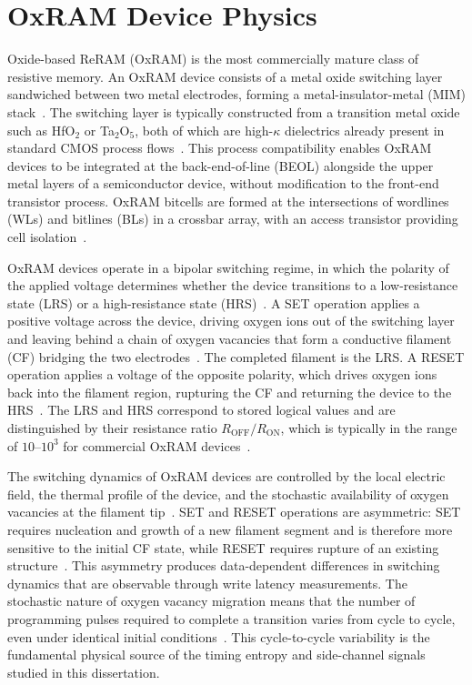 \section{OxRAM Device Physics}
\label{sec:bg-oxram}

Oxide-based ReRAM (OxRAM) is the most commercially mature class of
resistive memory. An OxRAM device consists of a metal oxide switching
layer sandwiched between two metal electrodes, forming a
metal-insulator-metal (MIM) stack~\cite{wong2012metal,chen2020reram}.
The switching layer is typically constructed from a transition metal
oxide such as HfO$_2$ or Ta$_2$O$_5$, both of which are high-$\kappa$
dielectrics already present in standard CMOS process
flows~\cite{wong2012metal, chenReRAMHistory2020}. This process
compatibility enables OxRAM devices to be integrated at the
back-end-of-line (BEOL) alongside the upper metal layers of a
semiconductor device, without modification to the front-end transistor
process. OxRAM bitcells are formed at the intersections of wordlines
(WLs) and bitlines (BLs) in a crossbar array, with an access transistor
providing cell isolation~\cite{wong2012metal}.



OxRAM devices operate in a bipolar switching regime, in which the
polarity of the applied voltage determines whether the device
transitions to a low-resistance state (LRS) or a high-resistance state
(HRS)~\cite{wong2012metal, chen2020reram}. A SET operation applies a
positive voltage across the device, driving oxygen ions out of the
switching layer and leaving behind a chain of oxygen vacancies that form
a conductive filament (CF) bridging the two
electrodes~\cite{wei2008highly, yu2012switching}. The completed filament
is the LRS. A RESET operation applies a voltage of the opposite
polarity, which drives oxygen ions back into the filament region,
rupturing the CF and returning the device to the
HRS~\cite{yu2012switching}. The LRS and HRS correspond to stored logical
values and are distinguished by their resistance ratio
$R_\text{OFF}/R_\text{ON}$, which is typically in the range of
$10$--$10^3$ for commercial OxRAM devices~\cite{chenReRAMHistory2020}.

The switching dynamics of OxRAM devices are controlled by the local
electric field, the thermal profile of the device, and the stochastic
availability of oxygen vacancies at the filament
tip~\cite{yu2012switching}. SET and RESET operations are asymmetric: SET
requires nucleation and growth of a new filament segment and is
therefore more sensitive to the initial CF state, while RESET requires
rupture of an existing structure~\cite{yu2012switching, wei2008highly}.
This asymmetry produces data-dependent differences in switching dynamics
that are observable through write latency measurements. The stochastic
nature of oxygen vacancy migration means that the number of programming
pulses required to complete a transition varies from cycle to cycle,
even under identical initial conditions~\cite{6582090, 6724732}. This
cycle-to-cycle variability is the fundamental physical source of the
timing entropy and side-channel signals studied in this dissertation.